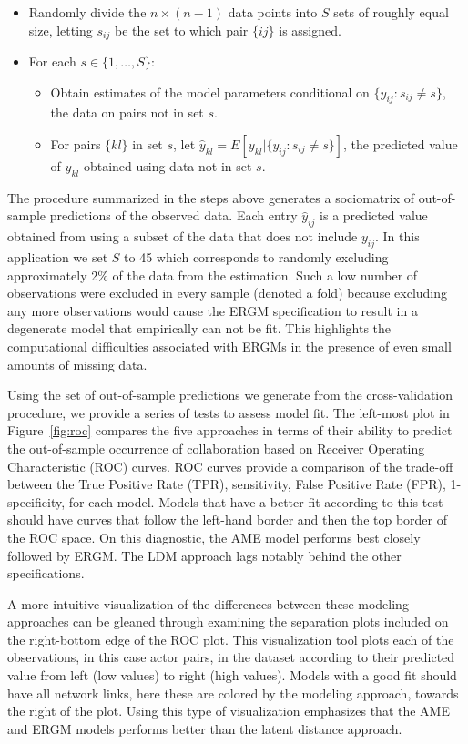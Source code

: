 \documentclass[12pt,twocolumn,twoside]{pnas-new}
\begin{document}
\begin{itemize}
	\item Randomly divide the $n \times (n-1)$ data points into $S$ sets of roughly equal size, letting $s_{ij}$ be the set to which pair $\{ij\}$ is assigned.
	\item For each $s \in \{1, \ldots, S\}$:
	\begin{itemize}
		\item Obtain estimates of the model parameters conditional on $\{y_{ij} : s_{ij} \neq s\}$, the data on pairs not in set $s$.
		\item For pairs $\{kl\}$ in set $s$, let $\hat y_{kl} = E[y_{kl} | \{y_{ij} : s_{ij} \neq s\}]$, the predicted value of $y_{kl}$ obtained using data not in set $s$.
	\end{itemize}
\end{itemize}

The procedure summarized in the steps above generates a sociomatrix of out-of-sample predictions of the observed data. Each entry $\hat y_{ij}$ is a predicted value obtained from using a subset of the data that does not include $y_{ij}$. In this application we set $S$ to 45 which corresponds to randomly excluding approximately 2\% of the data from the estimation. Such a low number of observations were excluded in every sample (denoted a fold) because excluding any more observations would cause the ERGM specification to result in a degenerate model that empirically can not be fit. This highlights the computational difficulties associated with ERGMs in the presence of even small amounts of missing data.

Using the set of out-of-sample predictions we generate from the cross-validation procedure, we provide a series of tests to assess model fit. The left-most plot in Figure~\ref{fig:roc} compares the five approaches in terms of their ability to predict the out-of-sample occurrence of collaboration based on Receiver Operating Characteristic (ROC) curves. ROC curves provide a comparison of the trade-off between the True Positive Rate (TPR), sensitivity, False Positive Rate (FPR), 1-specificity, for each model. Models that have a better fit according to this test should have curves that follow the left-hand border and then the top border of the ROC space. On this diagnostic, the AME model performs best closely followed by ERGM. The LDM approach lags notably behind the other specifications. 

A more intuitive visualization of the differences between these modeling approaches can be gleaned through examining the separation plots included on the right-bottom edge of the ROC plot. This visualization tool plots each of the observations, in this case actor pairs, in the dataset according to their predicted value from left (low values) to right (high values). Models with a good fit should have all network links, here these are colored by the modeling approach, towards the right of the plot. Using this type of visualization emphasizes that the AME and ERGM models performs better than the latent distance approach.
\end{document}
